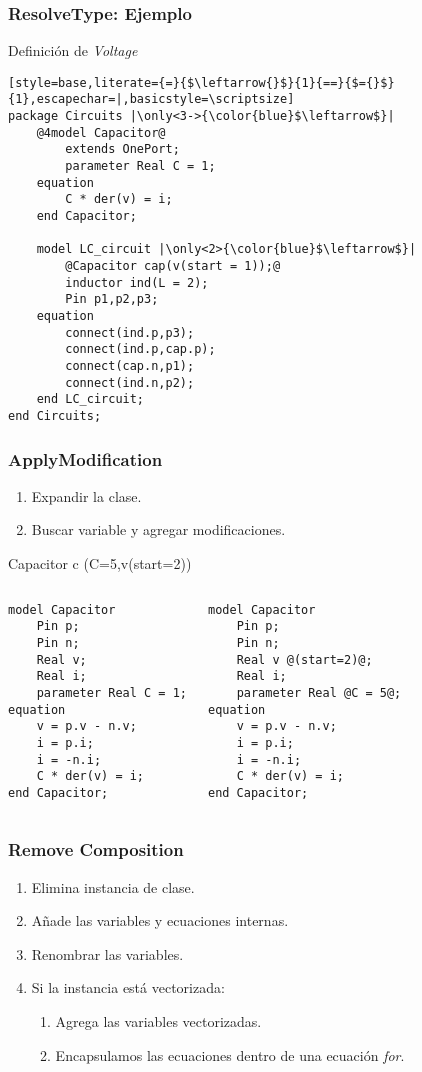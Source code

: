 \begin{frame}[fragile]
\frametitle{ResolveType: Ejemplo} 
Definición de \textit{Voltage}
\begin{lstlisting}[style=base,literate={=}{$\leftarrow{}$}{1}{==}{$={}$}{1},escapechar=|,basicstyle=\scriptsize]
package Circuits |\only<3->{\color{blue}$\leftarrow$}|
    @4model Capacitor@
        extends OnePort;
        parameter Real C = 1;
    equation
        C * der(v) = i;
    end Capacitor;
    
    model LC_circuit |\only<2>{\color{blue}$\leftarrow$}|
        @Capacitor cap(v(start = 1));@
        inductor ind(L = 2);
        Pin p1,p2,p3;
    equation
        connect(ind.p,p3);
        connect(ind.p,cap.p);
        connect(cap.n,p1);
        connect(ind.n,p2);
    end LC_circuit;
end Circuits;
\end{lstlisting}
\end{frame}


\begin{frame}[fragile]
\frametitle{ApplyModification} 
\begin{enumerate}
\item Expandir la clase.
\item Buscar variable y agregar modificaciones.
\end{enumerate}

    Capacitor c (C=5,v(start=2))
\pause
\begin{columns} 
\begin{lstlisting}[style=base,basicstyle=\scriptsize]
model Capacitor 
    Pin p;
    Pin n;
    Real v;
    Real i;
    parameter Real C = 1;
equation
    v = p.v - n.v;
    i = p.i;
    i = -n.i;
    C * der(v) = i;
end Capacitor;
\end{lstlisting}
\begin{lstlisting}[style=base,basicstyle=\scriptsize]
model Capacitor 
    Pin p;
    Pin n;
    Real v @(start=2)@;
    Real i;
    parameter Real @C = 5@;
equation
    v = p.v - n.v;
    i = p.i;
    i = -n.i;
    C * der(v) = i;
end Capacitor;
\end{lstlisting}
\end{columns}
\end{frame}

\begin{frame}[fragile]
\frametitle{Remove Composition} 
\begin{enumerate}
\item Elimina instancia de clase.
\item Añade las variables y ecuaciones internas.
\item Renombrar las variables.
\item Si la instancia está vectorizada: 
    \begin{enumerate}
    \item Agrega las variables vectorizadas.
    \item Encapsulamos las ecuaciones dentro de una ecuación \textit{for}.
    \end{enumerate} 
\end{enumerate}

\end{frame}


